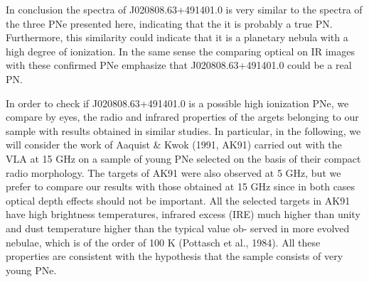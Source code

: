 \documentclass[fleqn,usenatbib]{mnras}
\begin{document}
In conclusion the spectra of J020808.63+491401.0 is very similar to the spectra
of the three PNe presented here, indicating that the it is probably a true PN.
Furthermore, this similarity could indicate that it is a planetary nebula with a
high degree of ionization. In the same sense the comparing optical on IR images
with these confirmed PNe emphasize that J020808.63+491401.0 could be a real PN.


In order to check if J020808.63+491401.0  is a possible
high ionization PNe, we compare by eyes, the radio and
infrared properties of the
argets belonging to our sample with results obtained in
similar studies. In particular, in the following, we will
consider the work of Aaquist \& Kwok (1991, AK91) carried
out with the VLA at 15 GHz on a sample of young PNe
selected on the basis of their compact radio morphology.
The targets of AK91 were also observed at 5 GHz, but
we prefer to compare our results with those obtained at
15 GHz since in both cases optical depth effects should
not be important. All the selected targets in AK91 have
high brightness temperatures, infrared excess (IRE) much higher than unity
and dust temperature higher than the typical value ob-
served in more evolved nebulae, which is of the order of
100 K (Pottasch et al., 1984). All these properties are
consistent with the hypothesis that the sample consists of
very young PNe.
\end{document}
